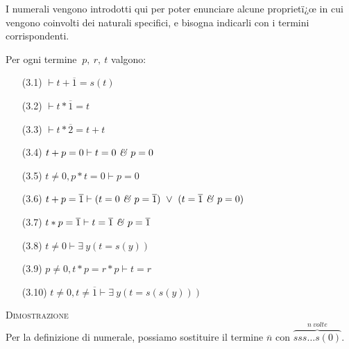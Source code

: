 I numerali vengono introdotti qui per poter enunciare alcune proprietï¿œ in cui vengono coinvolti dei naturali specifici, e bisogna indicarli con i termini corrispondenti.
\newpage
\begin{prop}
Per ogni termine $\ p,\ r,\ t$ valgono:
\begin{enumerate}
	\item[(3.1)] $\vdash t+\overline{1}=s(t)$
	\vspace{.2cm}
	\item[(3.2)] $\vdash t*\overline{1}=t$
	\vspace{.2cm}
	\item[(3.3)] $\vdash t*\overline{2}=t+t$
	\vspace{.2cm}
	\item[(3.4)] $t+p=0\vdash t=0\ \mbox{\emph{\&}}\ p=0$
	\vspace{.2cm}
	\item[(3.5)] $t\neq 0,p*t=0\vdash p=0$
	\vspace{.2cm}
	\item[(3.6)] $t+p=\overline{1}\vdash (t=0\ \mbox{\emph{\&}}\ p=\overline{1})\ \vee\ (t=\overline{1}\ \mbox{\emph{\&}}\ p=0)$
	\vspace{.2cm}
	\item[(3.7)] $t*p=\overline{1}\vdash t=\overline{1}\ \mbox{\emph{\&}}\ p=\overline{1}$
	\vspace{.2cm}
	\item[(3.8)] $t\neq 0\vdash \exists\ y (t=s(y))$
	\vspace{.2cm}
	\item[(3.9)] $p\neq 0,t*p=r*p\vdash t=r$
	\vspace{.2cm}
	\item[(3.10)] $t\neq 0,t\neq \overline{1}\vdash \exists\ y(t=s(s(y)))$
\end{enumerate}
\end{prop}
\vspace{.5cm}
\textsc{Dimostrazione}\\
 Per la definizione di nume\-rale, possiamo sostituire il termine $\overline{n}$ con ${\overbrace{sss\dots s(0)}^{n\ volte}}$.
